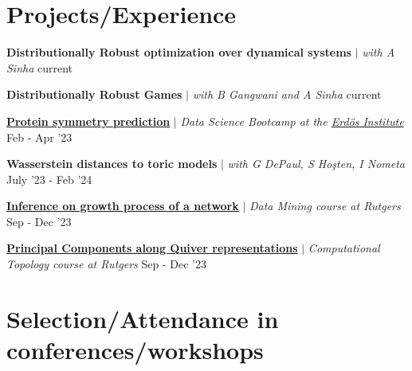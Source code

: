 \section{Projects/Experience}
\resumeSubHeadingListStart


\resumeProjectHeading
{\textbf{Distributionally Robust optimization over dynamical systems} $|$ \textit{\color{gray}with A Sinha}}
{current}
{}
\vspace{\mygap}

\resumeProjectHeading
{\textbf{Distributionally Robust Games} $|$ \textit{\color{gray}with B Gangwani and A Sinha}}
{current}
{}
\vspace{\mygap}

\resumeProjectHeading
{\href{https://www.erdosinstitute.org/certificates/spring-2024/data-science-boot-camp/nilava-metya}{\textbf{Protein symmetry prediction}} $|$ \textit{\color{gray}Data Science Bootcamp at the \href{https://www.erdosinstitute.org}{Erd\"os Institute}}}
{Feb - Apr '23}
{}
\vspace{\mygap}

\resumeProjectHeading
{\textbf{Wasserstein distances to toric models} $|$ \textit{\color{gray}with G DePaul, S Ho\c{s}ten, I Nometa}}
{July '23 - Feb '24}
{}
\vspace{\mygap}

\resumeProjectHeading
{\href{https://youtu.be/l2dJ6WUBLzs}
{\textbf{Inference on growth process of a network}} $|$ \textit{\color{gray}Data Mining course at Rutgers}}
{Sep - Dec '23}
{}
\vspace{\mygap}

\resumeProjectHeading
{\href{https://nilavam.github.io/TDA_quiver.pdf}{\textbf{Principal Components along Quiver representations}} $|$ \textit{\color{gray}Computational Topology course at Rutgers}}
{Sep - Dec '23}
{}
\vspace{\gap}



\resumeSubHeadingListEnd

\section{Selection/Attendance in conferences/workshops}
\resumeSubHeadingListStart

